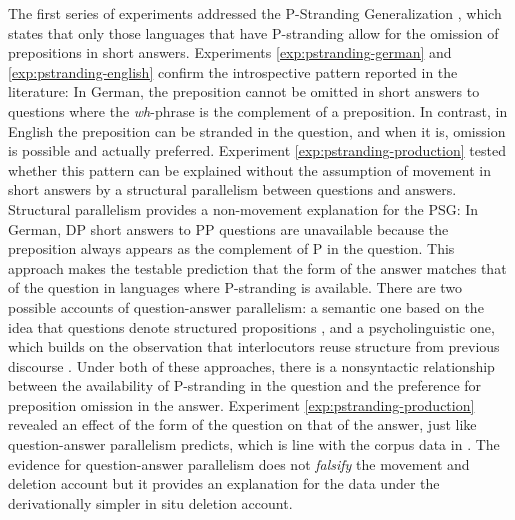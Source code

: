The first series of experiments addressed the P-Stranding Generalization \citep{merchant2001,merchant2004}, which states that only those languages that have P-stranding allow for the omission of prepositions in short answers. Experiments \ref{exp:pstranding-german} and \ref{exp:pstranding-english} confirm the introspective pattern reported in the literature: In German, the preposition cannot be omitted in short answers to questions where the \textit{wh}-phrase is the complement of a preposition. In contrast, in English the preposition can be stranded in the question, and when it is, omission is possible and actually preferred. Experiment \ref{exp:pstranding-production} tested whether this pattern can be explained without the assumption of movement in short answers by a structural parallelism between questions and answers. Structural parallelism provides a non-movement explanation for the PSG: In German, DP short answers to PP questions are unavailable because the preposition always appears as the complement of P in the question. This approach makes the testable prediction that the form of the answer matches that of the question in languages where P-stranding is available. There are two possible accounts of question-answer parallelism: a semantic one based on the idea that questions denote structured propositions \citep{reich2002}, and a psycholinguistic one, which builds on the observation that interlocutors reuse structure from previous discourse \citep{levelt.kelter1982}. Under both of these approaches, there is a nonsyntactic relationship between the availability of P-stranding in the question and the preference for preposition omission in the answer. Experiment \ref{exp:pstranding-production} revealed an effect of the form of the question on that of the answer, just like question-answer parallelism predicts, which is line with the corpus data in \citet{nykiel2017}. The evidence for question-answer parallelism does not \textit{falsify} the movement and deletion account but it provides an explanation for the data under the derivationally simpler in situ deletion account.

